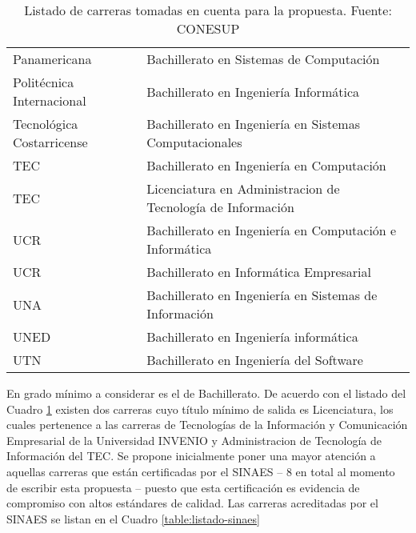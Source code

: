 \begin{table}[h!]
\begin{tabular}{ll}
        Panamericana & Bachillerato en Sistemas de Computación \\
        Politécnica Internacional	& Bachillerato en Ingeniería Informática \\
        Tecnológica Costarricense & Bachillerato en Ingeniería en Sistemas Computacionales \\
        TEC & Bachillerato en Ingeniería en Computación \\
        TEC & Licenciatura en Administracion de Tecnología de Información \\
        UCR & Bachillerato en Ingeniería en Computación e Informática \\
        UCR & Bachillerato en Informática Empresarial \\
        UNA & Bachillerato en Ingeniería en Sistemas de Información \\
        UNED & Bachillerato en Ingeniería informática \\
        UTN & Bachillerato en Ingeniería del Software \\
        \bottomrule[1.5pt]        
    \end{tabular}
    \caption{\footnotesize{Listado de carreras tomadas en cuenta para la propuesta. Fuente: CONESUP}}
    \label{table:listado-conesup}
\end{table}

En grado mínimo a considerar es el de Bachillerato. De acuerdo con el listado del Cuadro \ref{table:listado-conesup} existen dos carreras cuyo título mínimo de salida es Licenciatura, los cuales pertenence a las carreras de Tecnologías de la Información y Comunicación Empresarial de la Universidad INVENIO y Administracion de Tecnología de Información del TEC. Se propone inicialmente poner una mayor atención a aquellas carreras que están certificadas por el SINAES -- 8 en total al momento de escribir esta propuesta -- puesto que esta certificación es evidencia de compromiso con altos estándares de calidad. Las carreras acreditadas por el SINAES se listan en el Cuadro \ref{table:listado-sinaes}

